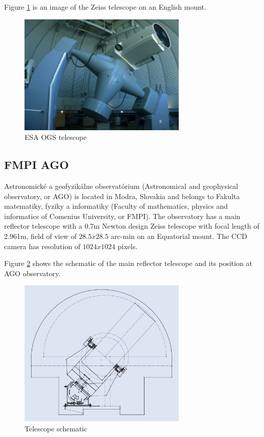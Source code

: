 	Figure \ref{fig:esaogs2} is an image of the Zeiss telescope on an English mount.

\begin{figure}[H]
\centering
  \includegraphics[width=8cm]{images/ESAOGS2}
  \caption{ESA OGS telescope}
  \label{fig:esaogs2}
\end{figure}

\subsection{FMPI AGO}\label{subsec:fmpi_ago}
Astronomické a geofyzikálne observatórium (Astronomical and geophysical observatory, or AGO) is located in Modra, Slovakia and belongs to Fakulta matematiky, fyziky a informatiky (Faculty of mathematics, physics and informatics of Comenius University, or FMPI). The observatory has a main reflector telescope with a 0.7m Newton design Zeiss telescope with focal length of 2.961m, field of view of $28.5 x 28.5$ arc-min on an Equatorial mount. The CCD camera has resolution of $1024 x 1024$ pixels.

	Figure \ref{fig:fmpiago1} shows the schematic of the main reflector telescope and its position at AGO observatory.
	
\begin{figure}[H]
  \centering
  \includegraphics[width=8cm]{images/FMPIAGO1}
  \caption{Telescope schematic}
  \label{fig:fmpiago1}
\end{figure}

